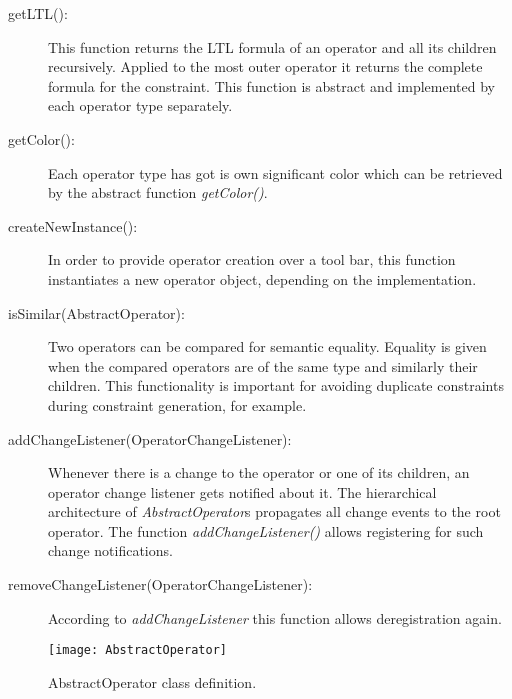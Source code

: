 \begin{description}
	\item[getLTL():] This function returns the LTL formula of an operator and all its children recursively. Applied to the most outer operator it returns the complete formula for the constraint. This function is abstract and implemented by each operator type separately.
	\item[getColor():] Each operator type has got is own significant color which can be retrieved by the abstract function \emph{getColor()}.
	\item[createNewInstance():] In order to provide operator creation over a tool bar, this function instantiates a new operator object, depending on the implementation.
	\item[isSimilar(AbstractOperator):] Two operators can be compared for semantic equality. Equality is given when the compared operators are of the same type and similarly their children. This functionality is important for avoiding duplicate constraints during constraint generation, for example.
	\item[addChangeListener(OperatorChangeListener):] Whenever there is a change to the operator or one of its children, an operator change listener gets notified about it. The hierarchical architecture of \emph{AbstractOperator}s propagates all change events to the root operator. The function \emph{addChangeListener()} allows registering for such change notifications.
	\item[removeChangeListener(OperatorChangeListener):] According to \emph{addChangeListener} this function allows deregistration again.
\end{description}

\begin{figure}[htbp]
  \centering
  \texttt{[image: AbstractOperator]} 
  \caption{AbstractOperator class definition.}
  \label{fig:abstractoperator}
\end{figure}

